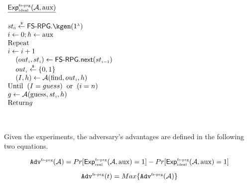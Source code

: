    \begin{minipage}{57mm}
\begin{tcolorbox}[left=0mm]
$
  \begin{array}{l}
 \underline{\mathsf{Exp}_{\sss \text{ideal}}^{\sss \text{fs-prg}}(\mathcal{A}, \text{aux})}\\
  \\
   {st}_{\sss 0}\stackrel{\sss \$}\leftarrow \mathsf{FS\text{-}RPG}.\kgen (1^{\sss \lambda}) \\
%
i\gets 0; h\gets \text{aux} \\
\text {Repeat}\\
i\gets i+1\\
\hspace{4mm} ({out}_{\sss i}, st_{\sss i})\leftarrow  \mathsf{FS\text{-}RPG.next}   (st_{\sss i-1})\\
\hspace{4mm}{out}_{\sss i}\stackrel{\sss \$}\leftarrow\{0, 1\}\\
\hspace{4mm}  (I,h)\gets\mathcal{A}(\text{find}, out_{\sss i}, h)\\
\text{Until}\hspace{2mm}  (I=guess)\hspace{2mm}  \text{or}\hspace{2mm}  (i=n)\\
g\gets\mathcal{A}(\text{guess}, st_{\sss i}, h)\\
\text{Return} g\\
  \end{array}%
$
\end{tcolorbox}
   \end{minipage}
   
\



Given the experiments, the adversary's advantages are defined in the following two equations. 


\begin{equation}\label{equ::adv-1st-term}
\mathtt{Adv}^{\scriptscriptstyle \text{fs-prg}}(\mathcal{A})=Pr[\mathsf{Exp}_{\scriptscriptstyle \text{real}}^{\scriptscriptstyle \text{fs-prg}}(\mathcal{A},\text{aux})=1]-Pr[\mathsf{Exp}_{\scriptscriptstyle \text{ideal}}^{\scriptscriptstyle \text{fs-prg}}(\mathcal{A},\text{aux})=1]
\end{equation}


\begin{equation}\label{equ::adv-2nd-term}
\mathtt{Adv}^{\scriptscriptstyle \text{fs-prg}}(t)= Max\{\mathtt{Adv}^{\scriptscriptstyle \text{fs-prg}}(\mathcal{A})\}
\end{equation}


